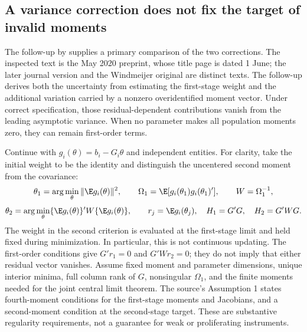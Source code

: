 \subsection{A variance correction does not fix the target of invalid moments}
\label{rel32:gmm-variance-target}
\providecommand{\USD}[1]{\ensuremath{\mathrm{USD}\,#1}}
The follow-up by \citet[Sections 2--4]{rel32hkl} supplies a primary
comparison of the two corrections. The inspected text is the May 2020
preprint, whose title page is dated 1 June; the later journal version
and the Windmeijer original are distinct texts. The follow-up derives
both the uncertainty from estimating the first-stage weight and the
additional variation carried by a nonzero overidentified moment vector.
Under correct specification, those residual-dependent contributions
vanish from the leading asymptotic variance. When no parameter makes
all population moments zero, they can remain first-order terms.

Continue with $g_i(\theta)=b_i-G_i\theta$ and independent entities.
For clarity, take the initial weight to be the identity and distinguish
the uncentered second moment from the covariance:
\[
 \theta_1=\arg\min_\theta\|\E g_i(\theta)\|^2,\qquad
 \Omega_1=\E[g_i(\theta_1)g_i(\theta_1)'],\qquad W=\Omega_1^{-1},
\]
\[
 \theta_2=\arg\min_\theta
       \{\E g_i(\theta)\}'W\{\E g_i(\theta)\},\qquad
 r_j=\E g_i(\theta_j),\quad H_1=G'G,\quad H_2=G'WG.
\]
The weight in the second criterion is evaluated at the first-stage
limit and held fixed during minimization. In particular, this is not
continuous updating. The first-order conditions give $G'r_1=0$ and
$G'Wr_2=0$; they do not imply that either residual vector vanishes.
Assume fixed moment and parameter dimensions, unique interior minima,
full column rank of $G$, nonsingular $\Omega_1$, and the finite moments
needed for the joint central limit theorem. The source's Assumption 1
states fourth-moment conditions for the first-stage moments and
Jacobians, and a second-moment condition at the second-stage target.
These are substantive regularity requirements, not a guarantee for
weak or proliferating instruments.

